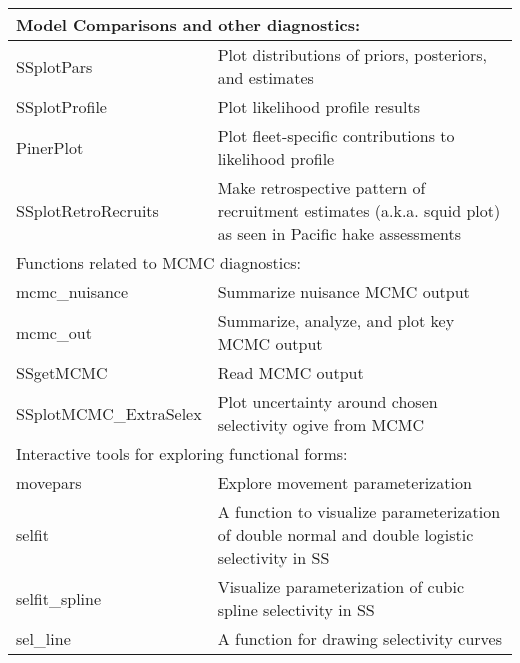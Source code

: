 \begin{center}
\begin{longtable}{p{4.5cm} p{10.52cm}}
		\multicolumn{2}{l}{Model Comparisons and other diagnostics:} \Tstrut\Bstrut\\
		\hline
		SSplotPars    \Tstrut & Plot distributions of priors, posteriors, and estimates \\
		SSplotProfile \Tstrut & Plot likelihood profile results \\
		PinerPlot     \Tstrut & Plot fleet-specific contributions to likelihood profile \\
		SSplotRetroRecruits \Tstrut & Make retrospective pattern of recruitment estimates (a.k.a. squid plot) as seen in Pacific hake assessments\Bstrut \\
		\hline
		
		\multicolumn{2}{l}{Functions related to MCMC diagnostics:}\Tstrut\Bstrut\\
		\hline
		mcmc\_nuisance \Tstrut & Summarize nuisance MCMC output \\
		mcmc\_out      \Tstrut & Summarize, analyze, and plot key MCMC output \\
		SSgetMCMC      \Tstrut & Read MCMC output \\
		SSplotMCMC\_ExtraSelex \Tstrut & Plot uncertainty around chosen selectivity ogive from MCMC \Bstrut\\
		\hline
		
		\multicolumn{2}{l}{Interactive tools for exploring functional forms:} \Tstrut\Bstrut\\
		\hline
		movepars    \Tstrut  & Explore movement parameterization \\
		selfit      \Tstrut  & A function to visualize parameterization of double normal and double logistic selectivity in SS \\
		selfit\_spline \Tstrut & Visualize parameterization of cubic spline selectivity in SS \\
		sel\_line   \Tstrut & A function for drawing selectivity curves\Bstrut \\
		\hline



\end{longtable}
\end{center}
